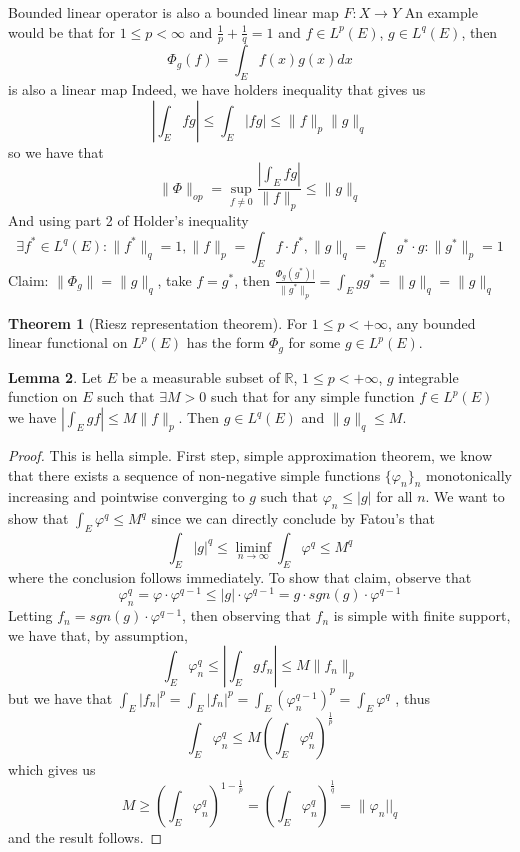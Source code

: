 \documentclass[12pt]{article}
\theoremstyle{definition}
\newtheorem{theorem}{Theorem}[section]
\newtheorem{lemma}[theorem]{Lemma}
\begin{document}
	Bounded linear operator is also a bounded linear map $F \colon X \to Y$
	An example would be that for $1 \leq p < \infty$ and $\frac{1}{p} + \frac{1}{q} = 1$ and $f \in L^p(E)$, $g \in L^q(E)$, then 
	$$\Phi_g(f) = \int_E f(x)g(x)dx$$ is also a linear map
	Indeed, we have holders inequality that gives us 
	$$ |\int_E fg | \leq \int_E |fg| \leq \|f\|_p \|g\|_q$$
	so we have that 
	$$ \|\Phi\|_{op} = \sup_{f \neq 0} \frac{| \int_E fg|}{\|f\|_p} \leq \|g\|_q$$
	And using part 2 of Holder's inequality 
	$$ \exists f^* \in L^q(E) \colon \|f^*\|_q = 1, \|f\|_p = \int_E f \cdot f^*, \|g\|_q = \int_E g^*\cdot g \colon \|g^*\|_p = 1$$
	Claim: $\|\Phi_g\| = \|g\|_q$, take $f = g^*$, then $\frac{\Phi_g(g^*)|}{\|g^*\|_p} = \int_E gg^* = \|g\|_q = \|g\|_q$
	\begin{theorem}[Riesz representation theorem]
		For $1 \leq p < + \infty$, any bounded linear functional on $L^p(E)$ has the form $\Phi_g$ for some $g \in L^p(E)$. 
		
	\end{theorem}
	\begin{lemma}
		Let $E$ be a measurable subset of $\mathbb{R}$, $1 \leq p < +\infty$, $g$ integrable function on $E$ such that $\exists M>0$ such that for any simple function $f \in L^p(E)$ we have $\left | \int_E gf \right| \leq M \|f\|_p$. Then $g \in L^q(E)$ and $\|g\|_q \leq M$. 
	\end{lemma}
	\begin{proof}
		This is hella simple. First step, simple approximation theorem, we know that there exists a sequence of non-negative simple functions $\{\varphi_n\}_{n}$ monotonically increasing and pointwise converging to $g$ such that $\varphi_n \leq |g|$ for all $n$. We want to show that $\int_E \varphi^q \leq M^q$ since we can directly conclude by Fatou's that
		$$ \int_E |g|^q \leq \liminf_{n \to \infty} \int_E \varphi^q \leq M^q $$
	where the conclusion follows immediately. To show that claim, observe that 
	$$ \varphi_n^q = \varphi \cdot \varphi^{q-1} \leq |g| \cdot \varphi^{q-1} = g \cdot sgn(g) \cdot \varphi^{q-1}$$
	Letting $f_n = sgn(g)\cdot \varphi^{q-1}$, then observing that $f_n$ is simple with finite support, we have that, by assumption,
	$$
	 	\int_E \varphi_n^q\leq \left | \int_E gf_n  \right| \leq M \|f_n\|_p
	$$
	but we have that $\int_E |f_n|^p = \int_E |f_n|^p = \int_E (\varphi_n^{q-1})^{p} = \int_E \varphi^q$
, thus 
$$ \int_E \varphi_n^q \leq M \left(\int_E \varphi_n^q\right)^{\frac{1}{p}}$$
which gives us
$$ M \geq \left(\int_E \varphi_n^q\right)^{1-\frac{1}{p}} = \left(\int_E \varphi^q_n \right)^{\frac{1}{q}} = \|\varphi_n||_q $$
and the result follows. 
	\end{proof}
\end{document}
